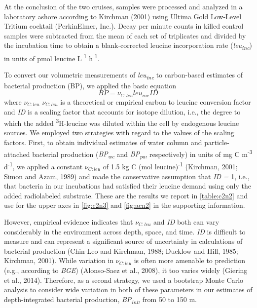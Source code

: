 At the conclusion of the two cruises, samples were processed and analyzed in a laboratory ashore according to Kirchman (2001) using Ultima Gold Low-Level Tritium cocktail (PerkinElmer, Inc.). Decay per minute counts in killed control samples were subtracted from the mean of each set of triplicates and divided by the incubation time to obtain a blank-corrected leucine incorporation rate (\emph{leu\textsubscript{inc}}) in units of pmol leucine L\textsuperscript{-1} h\textsuperscript{-1}.

To convert our volumetric measurements of \emph{leu\textsubscript{inc}} to carbon-based estimates of bacterial production (BP), we applied the basic equation
\begin{equation} \label{eq:c2e1}
BP = {\nu _{C:leu}}le{u_{inc}}ID
\end{equation}
where $\nu _{C:leu}$ $\nu _{C:leu}$ is a theoretical or empirical carbon to leucine conversion factor and \emph{ID} is a scaling factor that accounts for isotope dilution, i.e., the degree to which the added \textsuperscript{3}H-leucine was diluted within the cell by endogenous leucine sources. We employed two strategies with regard to the values of the scaling factors. First, to obtain individual estimates of water column and particle-attached bacterial production (\emph{BP\textsubscript{wc}} and \emph{BP\textsubscript{pa}}, respectively) in units of mg C m\textsuperscript{-3} d\textsuperscript{-1}, we applied a constant $\nu _{C:leu}$ of 1.5 kg C (mol leucine)\textsuperscript{-1} (Kirchman, 2001; Simon and Azam, 1989) and made the conservative assumption that \emph{ID} \emph{=}  1, i.e., that bacteria in our incubations had satisfied their leucine demand using only the added radiolabeled substrate. These are the results we report in \autoref{table:c2n2} and use for the upper axes in \autoref{fig:c2n3} and \autoref{fig:acn2} in the supporting information.

However, empirical evidence indicates that $\nu _{C:leu}$ and \emph{ID} both can vary considerably in the environment across depth, space, and time. \emph{ID} is difficult to measure and can represent a significant source of uncertainty in calculations of bacterial production (Chin-Leo and Kirchman, 1988; Ducklow and Hill, 1985; Kirchman, 2001). While variation in $\nu _{C:leu}$ is often more amenable to prediction (e.g., according to \emph{BGE}) (Alonso-Saez et al., 2008), it too varies widely (Giering et al., 2014). Therefore, as a second strategy, we used a bootstrap Monte Carlo analysis to consider wide variation in both of these parameters in our estimates of depth-integrated bacterial production, \emph{BP\textsubscript{int}}, from 50 to 150 m.

